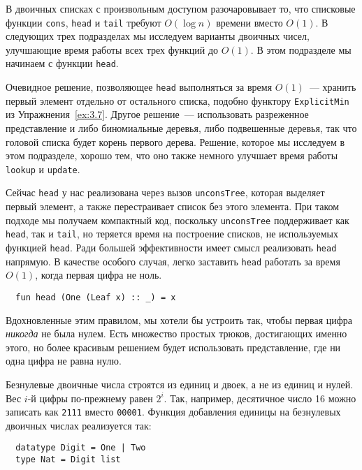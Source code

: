 \begin{frame}[fragile]{}

В двоичных списках с произвольным доступом разочаровывает то, что
списковые функции \lstinline!cons!, \lstinline!head! и
\lstinline!tail! требуют $O(\log n)$ времени вместо $O(1)$. В
следующих трех подразделах мы исследуем варианты двоичных чисел,
улучшающие время работы всех трех функций до $O(1)$. В этом подразделе
мы начинаем с функции \lstinline!head!.

\begin{remark}
  Очевидное решение, позволяющее \lstinline!head! выполняться за время
  $O(1)$~--- хранить первый элемент отдельно от остального списка,
  подобно функтору \lstinline!ExplicitMin! из
  Упражнения~\ref{ex:3.7}. Другое решение~--- использовать разреженное
  представление и либо биномиальные деревья, либо подвешенные деревья, так что
  головой списка будет корень первого дерева. Решение, которое мы
  исследуем в этом подразделе, хорошо тем, что оно также немного
  улучшает время работы \lstinline!lookup! и \lstinline!update!.
\end{remark}

Сейчас \lstinline!head! у нас реализована через вызов
\lstinline!unconsTree!, которая выделяет первый элемент, а также
перестраивает список без этого элемента. При таком подходе мы получаем
компактный код, поскольку \lstinline!unconsTree! поддерживает как
\lstinline!head!, так и \lstinline!tail!, но теряется время
на построение списков, не используемых функцией
\lstinline!head!. Ради большей эффективности имеет смысл реализовать
\lstinline!head! напрямую. В качестве особого случая, легко заставить
\lstinline!head! работать за время $O(1)$, когда первая цифра не ноль.
\begin{lstlisting}
  fun head (One (Leaf x) :: _) = x
\end{lstlisting}
Вдохновленные этим правилом, мы хотели бы устроить так, чтобы первая
цифра \emph{никогда} не была нулем. Есть множество простых трюков,
достигающих именно этого, но более красивым решением будет
использовать  представление, где ни одна
цифра не равна нулю.

Безнулевые двоичные числа строятся из единиц и двоек, а не из единиц и
нулей. Вес $i$-й цифры по-прежнему равен $2^i$. Так, например,
десятичное число 16 можно записать как \texttt{2111} вместо
\texttt{00001}. Функция добавления единицы на безнулевых двоичных
числах реализуется так:
\begin{lstlisting}
  datatype Digit = One | Two
  type Nat = Digit list


\end{lstlisting}
\end{frame}
